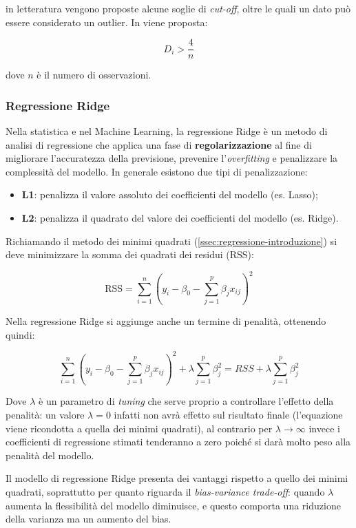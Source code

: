 in letteratura vengono proposte alcune soglie di \textit{cut-off}, oltre le quali un dato può essere considerato un outlier. In \cite{applied_regression} viene proposta:

$$D_{i}>\frac{4}{n}$$\smallskip

dove $n$ è il numero di osservazioni.

\subsubsection{Regressione Ridge}\label{sssec:regressione-ridge}
Nella statistica e nel Machine Learning, la regressione Ridge è un metodo di analisi di regressione che applica una fase di \textbf{regolarizzazione} al fine di migliorare l'accuratezza della previsione, prevenire l'\textit{overfitting} e penalizzare la complessità del modello.
In generale esistono due tipi di penalizzazione:
\begin{itemize}
  \item \textbf{L1}: penalizza il valore assoluto dei coefficienti del modello (es. Lasso); 
  \item \textbf{L2}: penalizza il quadrato del valore dei coefficienti del modello (es. Ridge).
\end{itemize}

Richiamando il metodo dei minimi quadrati (\ref{ssec:regressione-introduzione}) si deve minimizzare la somma dei quadrati dei residui (RSS):

$$\mathrm{RSS}=\sum_{i=1}^{n}\left(y_{i}-\beta_{0}-\sum_{j=1}^{p} \beta_{j} x_{i j}\right)^{2}$$\smallskip

Nella regressione Ridge si aggiunge anche un termine di penalità, ottenendo quindi:

$$\sum_{i=1}^{n}\left(y_{i}-\beta_{0}-\sum_{j=1}^{p} \beta_{j} x_{i j}\right)^{2}+\lambda \sum_{j=1}^{p} \beta_{j}^{2}=R S S+\lambda \sum_{j=1}^{p} \beta_{j}^{2}$$\smallskip

Dove $\lambda$ è un parametro di \textit{tuning} che serve proprio a controllare l’effetto della penalità: un valore $\lambda=0$ infatti non avrà effetto sul risultato finale (l’equazione viene ricondotta a quella dei minimi quadrati), al contrario per $\lambda \to \infty$ invece i coefficienti di regressione stimati tenderanno a zero poiché si darà molto peso alla penalità del modello. \cite{lasso_vs_ridge}

Il modello di regressione Ridge presenta dei vantaggi rispetto a quello dei minimi quadrati, soprattutto per quanto riguarda il \textit{bias-variance trade-off}: quando $\lambda$ aumenta la flessibilità del modello diminuisce, e questo comporta una riduzione della varianza ma un aumento del bias. 

